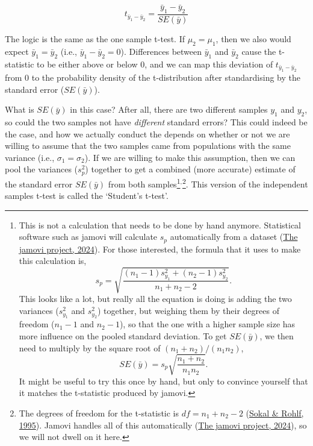 \documentclass[
  openany]{krantz}
\begin{document}
\[t_{\bar{y}_{1} - \bar{y}_{2}} = \frac{\bar{y}_{1} - \bar{y}_{2}}{SE(\bar{y})}\]

The logic is the same as the one sample t-test.
If \(\mu_{2} = \mu_{1}\), then we also would expect \(\bar{y}_{1} = \bar{y}_{2}\) (i.e., \(\bar{y}_{1} - \bar{y}_{2} = 0\)).
Differences between \(\bar{y}_{1}\) and \(\bar{y}_{2}\) cause the t-statistic to be either above or below 0, and we can map this deviation of \(t_{\bar{y}_{1} - \bar{y}_{2}}\) from 0 to the probability density of the t-distribution after standardising by the standard error (\(SE(\bar{y})\)).

What is \(SE(\bar{y})\) in this case?
After all, there are two different samples \(y_{1}\) and \(y_{2}\), so could the two samples not have \emph{different} standard errors?
This could indeed be the case, and how we actually conduct the  depends on whether or not we are willing to assume that the two samples came from populations with the same variance (i.e., \(\sigma_{1} = \sigma_{2}\)).
If we are willing to make this assumption, then we can pool the variances (\(s^{2}_{p}\)) together to get a combined (more accurate) estimate of the standard error \(SE(\bar{y})\) from both samples\footnote{This is not a calculation that needs to be done by hand anymore. Statistical software such as jamovi will calculate \(s_{p}\) automatically from a dataset (\protect\hyperlink{ref-Jamovi2022}{The jamovi project, 2024}). For those interested, the formula that it uses to make this calculation is, \[s_{p} = \sqrt{\frac{\left(n_{1} - 1 \right) s^{2}_{y_{1}} + \left(n_{2} - 1 \right) s^{2}_{y_{2}}}{n_{1} + n_{2} - 2}}.\] This looks like a lot, but really all the equation is doing is adding the two variances (\(s^{2}_{y_{1}}\) and \(s^{2}_{y_{2}}\)) together, but weighing them by their degrees of freedom (\(n_{1} - 1\) and \(n_{2} - 1\)), so that the one with a higher sample size has more influence on the pooled standard deviation. To get \(SE(\bar{y})\), we then need to multiply by the square root of \((n_{1} + n_{2})/(n_{1}n_{2})\), \[SE(\bar{y}) = s_{p}\sqrt{\frac{n_{1} + n_{2}}{n_{1}n_{2}}}.\] It might be useful to try this once by hand, but only to convince yourself that it matches the t-statistic produced by jamovi.}\(^{,}\)\footnote{The degrees of freedom for the t-statistic is \(df = n_{1} + n_{2} - 2\) (\protect\hyperlink{ref-Sokal1995}{Sokal \& Rohlf, 1995}). Jamovi handles all of this automatically (\protect\hyperlink{ref-Jamovi2022}{The jamovi project, 2024}), so we will not dwell on it here.}.
This version of the independent samples t-test is called the `Student's t-test'.
\end{document}
